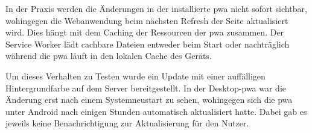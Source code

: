 In der Praxis werden die Änderungen in der installierte \ac{pwa} nicht sofort sichtbar, wohingegen die Webanwendung beim nächsten Refresh der Seite aktualisiert wird. Dies hängt mit dem Caching der Ressourcen der \ac{pwa} zusammen. Der Service Worker lädt cachbare Dateien entweder beim Start oder nachträglich während die \ac{pwa} läuft in den lokalen Cache des Geräts.

Um dieses Verhalten zu Testen wurde ein Update mit einer auffälligen Hintergrundfarbe auf dem Server bereitgestellt. In der Desktop-\ac{pwa} war die Änderung erst nach einem Systemneustart zu sehen, wohingegen sich die \ac{pwa} unter Android nach einigen Stunden automatisch aktualisiert hatte. Dabei gab es jeweils keine Benachrichtigung zur Aktualisierung für den Nutzer.






